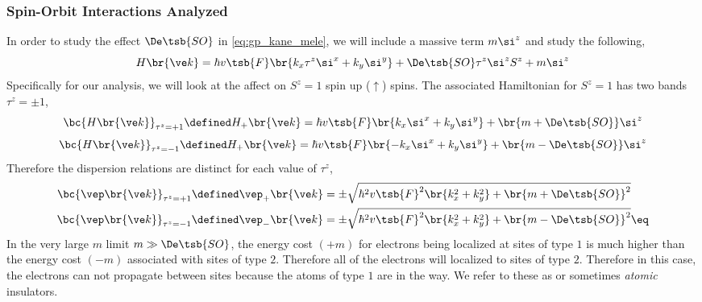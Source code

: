 \documentclass{article}
\begin{document}
\subsubsection{Spin-Orbit Interactions Analyzed}

In order to study the effect $\De\tsb{SO}$ in \cref{eq:gp_kane_mele}, we will include a massive term $m \si^{z}$ and study the following,
\[ H\br{\ve k} =\hbar v\tsb{F} \br{k_x \tau^{z} \si^x + k_y \si^{y}} + \De\tsb{SO} \tau^{z} \si^{z} S^{z} + m \si^{z}\]
Specifically for our analysis, we will look at the affect on $S^{z} = 1$ spin up ($\uparrow$) spins. The associated Hamiltonian for $S^{z} = 1$ has two bands $\tau^{z} = \pm 1$,
\[ \bc{H\br{\ve k}}_{\tau^{z} = +1} \defined H_{+}\br{\ve k} =\hbar v\tsb{F} \br{k_x \si^x + k_y \si^{y}} + \br{m + \De\tsb{SO}} \si^{z}\]
\[ \bc{H\br{\ve k}}_{\tau^{z} = -1} \defined H_{+}\br{\ve k} =\hbar v\tsb{F} \br{-k_x \si^x + k_y \si^{y}} + \br{m - \De\tsb{SO}} \si^{z}\]
Therefore the dispersion relations are distinct for each value of $\tau^{z}$,
\begin{align*}
    \bc{\vep\br{\ve k}}_{\tau^{z} = +1}\defined \vep_{+}\br{\ve k} &= \pm\sqrt{\hbar^2 v\tsb{F}^2 \br{k_x^2 + k_y^2} + \br{m + \De\tsb{SO}}^2} \\
    \bc{\vep\br{\ve k}}_{\tau^{z} = -1}\defined \vep_{-}\br{\ve k} &= \pm\sqrt{\hbar^2 v\tsb{F}^2 \br{k_x^2 + k_y^2} + \br{m - \De\tsb{SO}}^2} \eq \label{eq:gp_SOminus}
\end{align*}
In the very large $m$ limit $m \gg \De\tsb{SO}$, the energy cost $(+m)$ for electrons being localized at sites of type $1$ is much higher than the energy cost $(-m)$ associated with sites of type $2$. Therefore all of the electrons will localized to sites of type $2$. Therefore in this case, the electrons can not propagate between sites because the atoms of type $1$ are in the way. We refer to these as  or sometimes \textit{atomic} insulators. \\
\end{document}
